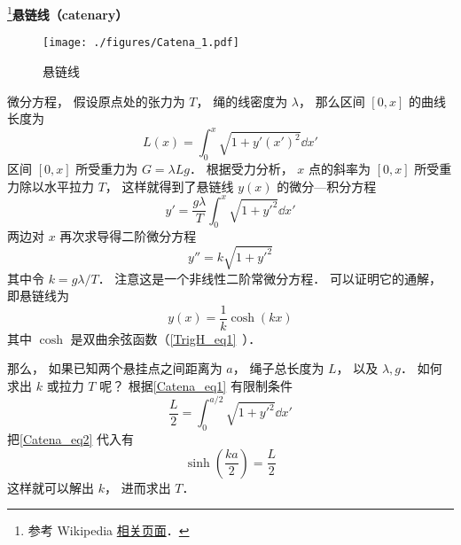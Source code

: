
\footnote{参考 Wikipedia \href{https://en.wikipedia.org/wiki/Catenary}{相关页面}．}\textbf{悬链线（catenary）}

\begin{figure}[ht]
\centering
\texttt{[image: ./figures/Catena\_1.pdf]}
\caption{悬链线} \label{Catena_fig1}
\end{figure}

微分方程， 假设原点处的张力为 $T$， 绳的线密度为 $\lambda$， 那么区间 $[0, x]$ 的曲线长度为
\begin{equation}\label{Catena_eq1}
L(x) = \int_0^x \sqrt{1 + y'(x')^2} \dd{x'}
\end{equation}
区间 $[0, x]$ 所受重力为 $G = \lambda L g$． 根据受力分析， $x$ 点的斜率为 $[0, x]$ 所受重力除以水平拉力 $T$， 这样就得到了悬链线 $y(x)$ 的微分—积分方程
\begin{equation}
y' = \frac{g\lambda}{T} \int_0^x \sqrt{1 + y'^2} \dd{x'}
\end{equation}
两边对 $x$ 再次求导得二阶微分方程
\begin{equation}
y'' = k \sqrt{1 + y'^2}
\end{equation}
其中令 $k = g\lambda/T$． 注意这是一个非线性二阶常微分方程． 可以证明它的通解， 即悬链线为
\begin{equation}\label{Catena_eq2}
y(x) = \frac{1}{k}\cosh(kx)
\end{equation}
其中 $\cosh$ 是双曲余弦函数（\autoref{TrigH_eq1}~）．

那么， 如果已知两个悬挂点之间距离为 $a$， 绳子总长度为 $L$， 以及 $\lambda, g$． 如何求出 $k$ 或拉力 $T$ 呢？ 根据\autoref{Catena_eq1} 有限制条件
\begin{equation}
\frac{L}{2} = \int_0^{a/2} \sqrt{1 + y'^2} \dd{x'}
\end{equation}
把\autoref{Catena_eq2} 代入有
\begin{equation}
\sinh(\frac{ka}{2}) = \frac{L}{2}
\end{equation}
这样就可以解出 $k$， 进而求出 $T$．
